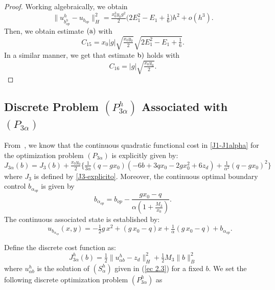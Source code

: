 \documentclass[11pt]{article}
\begin{document}
 \begin{proof}
 Working algebraically, we obtain 
$$  \lVert {u^h_{b^h_{op}}} - u_{b_{op}}  \rVert^2 _H=\tfrac{x_0^3  y_0 g^2}{2} \Big(2E_1^2-E_1+\tfrac{1}{6} \Big) h^2+o(h^3). $$
Then, we obtain estimate $\rm (a)$ with
 $$C_{15}=x_0  |g| \sqrt{\tfrac{x_0 y_0}{2}}\sqrt{2E_1^2-E_1+\tfrac{1}{6} }.$$
 In a similar manner, we get that estimate $\rm{b})$ holds with
 $$C_{16}=|g|\sqrt{\tfrac{x_0 y_0}{2}}.$$
 \end{proof}
 
   \subsection{Discrete Problem  ${(P^h_{3\alpha})}$ Associated with $(P_{3\alpha})$} %
  
  
   From~\cite{BoGaTa2020}, we know that  the continuous quadratic  functional cost in \eqref{J1-J1alpha} for the optimization problem  $(P_{3\alpha})$  is explicitly given by: 
      \begin{equation}\label{J3alpha-explicito}
          J_{3\alpha}(b)= J_3(b) +\tfrac{x_0 y_0}{2}\Big\{ \tfrac{1}{3\alpha}  (q - g x_0) (-6b + 3 q x_0 - 2 g x_0^2 + 6 z_d) +  \tfrac{1}{\alpha^2} (  q- g x_0)^2 \Big\}
      \end{equation}
      where $J_3$ is defined by \eqref{J3-explicito}.
      Moreover, the continuous optimal boundary control $b_{\alpha_{op}}$ is given by
\begin{equation}\label{balphaop}
          b_{\alpha_{op}} =b_{op}-  \frac{ g x_0-q}{\alpha (1+ \tfrac{M_3}{x_0})} .
     \end{equation}
\noindent The continuous associated state is established by: 
     \begin{equation}\label{ualpha-balphaop}
\qquad u_{b_{\alpha_{op}}}(x,y) = -\tfrac{1}{2} g\, x^2 + (g\, x_0 - q) x + \tfrac{1}{\alpha} (g\,x_0 - q) +b_{\alpha_{op}} .
       \end{equation}
       
       
     
\vspace{.2cm}
    
\noindent Define the discrete cost function as:
\begin{equation}    
    { J^h_{3\alpha}} (b)=  \tfrac{1}{2} \lVert {u^h_{\alpha b}} - z_d \rVert^2_H +  \tfrac{1}{2} M_3 \lVert b \rVert ^2_B 
     \end{equation}
where ${u^h_{\alpha b}}$ is the solution of ${ (S^h_{\alpha })}$ given in (\ref{ec 2.3}) {for a fixed $b$}.  We set the following discrete optimization problem ${(P^h_{3\alpha})}$ as
\end{document}
